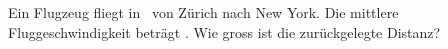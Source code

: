 Ein Flugzeug fliegt in \tFO\ von Zürich nach New York. Die mittlere Fluggeschwindigkeit beträgt \vFO. Wie gross ist die zurückgelegte Distanz?
